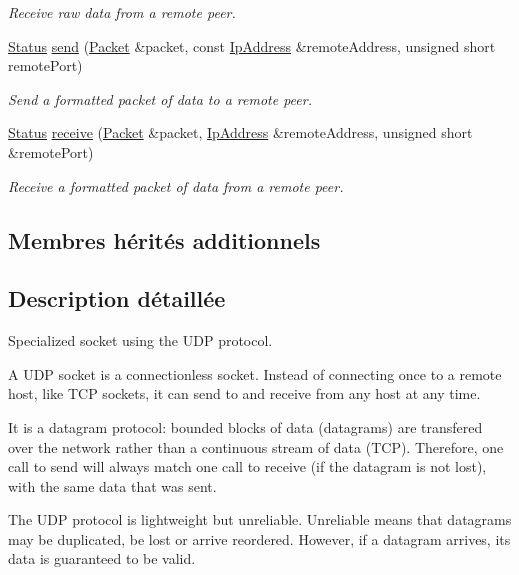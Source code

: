 \begin{DoxyCompactItemize}
\begin{DoxyCompactList}\small\item\em Receive raw data from a remote peer. \end{DoxyCompactList}\item 
\hyperlink{classsf_1_1Socket_a51bf0fd51057b98a10fbb866246176dc}{Status} \hyperlink{classsf_1_1UdpSocket_a48969a62c80d40fd74293a740798e435}{send} (\hyperlink{classsf_1_1Packet}{Packet} \&packet, const \hyperlink{classsf_1_1IpAddress}{Ip\+Address} \&remote\+Address, unsigned short remote\+Port)
\begin{DoxyCompactList}\small\item\em Send a formatted packet of data to a remote peer. \end{DoxyCompactList}\item 
\hyperlink{classsf_1_1Socket_a51bf0fd51057b98a10fbb866246176dc}{Status} \hyperlink{classsf_1_1UdpSocket_afdd5c655d00c96222d5b477fc057a22b}{receive} (\hyperlink{classsf_1_1Packet}{Packet} \&packet, \hyperlink{classsf_1_1IpAddress}{Ip\+Address} \&remote\+Address, unsigned short \&remote\+Port)
\begin{DoxyCompactList}\small\item\em Receive a formatted packet of data from a remote peer. \end{DoxyCompactList}\end{DoxyCompactItemize}
\subsection*{Membres hérités additionnels}


\subsection{Description détaillée}
Specialized socket using the U\+DP protocol. 

A U\+DP socket is a connectionless socket. Instead of connecting once to a remote host, like T\+CP sockets, it can send to and receive from any host at any time.

It is a datagram protocol\+: bounded blocks of data (datagrams) are transfered over the network rather than a continuous stream of data (T\+CP). Therefore, one call to send will always match one call to receive (if the datagram is not lost), with the same data that was sent.

The U\+DP protocol is lightweight but unreliable. Unreliable means that datagrams may be duplicated, be lost or arrive reordered. However, if a datagram arrives, its data is guaranteed to be valid.


